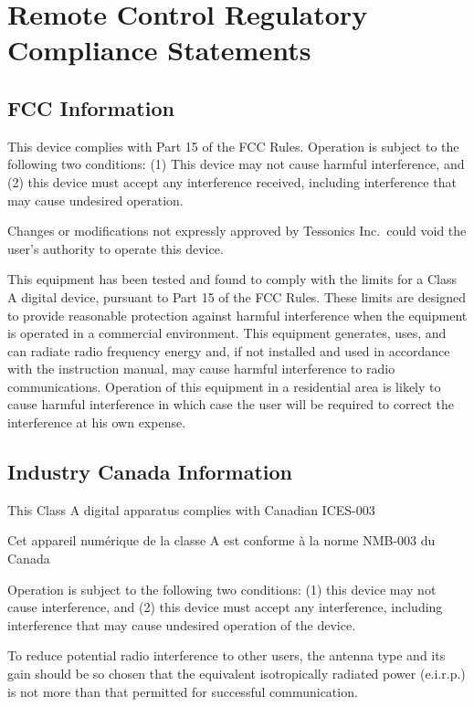 \chapter[remote-control-regulatory-compliance-statements]{Remote Control Regulatory Compliance Statements}

\section[fcc-information]{FCC Information}

This device complies with Part 15 of the FCC Rules. Operation is subject to the following two conditions: (1) This device may not cause harmful interference, and (2) this device must accept any interference received, including interference that may cause undesired operation.

Changes or modifications not expressly approved by Tessonics Inc. could void the user’s authority to operate this device.
\stopNOTE

This equipment has been tested and found to comply with the limits for a Class A digital device, pursuant to Part 15 of the FCC Rules. These limits are designed to provide reasonable protection against harmful interference when the equipment is operated in a commercial environment. This equipment generates, uses, and can radiate radio frequency energy and, if not installed and used in accordance with the instruction manual, may cause harmful interference to radio communications. Operation of this equipment in a residential area is likely to cause harmful interference in which case the user will be required to correct the interference at his own expense.
\stopNOTE

\section[industry-canada-information]{Industry Canada Information}

This Class A digital apparatus complies with Canadian ICES-003

Cet appareil numérique de la classe A est conforme à la norme NMB-003 du Canada

Operation is subject to the following two conditions: (1) this device may not cause interference, and (2) this device must accept any interference, including interference that may cause undesired operation of the device.

To reduce potential radio interference to other users, the antenna type and its gain should be so chosen that the equivalent isotropically radiated power (e.i.r.p.) is not more than that permitted for successful communication.

